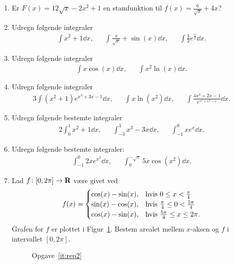 \begin{enumerate}
	\item Er $F(x)=12\sqrt{x}-2x^2+1$ en stamfunktion til $f(x)=\frac{6}{\sqrt{x}}+4x$?
	

	\item Udregn følgende integraler
	\begin{align*}
	\int x^2+1\dd x,&& \int \frac{x}{\sqrt{x}}+\sin(x)\dd x,&& \int \frac{1}{2}e^{\frac{x}{2}}\dd x.
	\end{align*}

		\item Udregn følgende integraler
	\begin{align*}
	\int x\cos(x)\dd x,&& \int x^2 \ln(x)\dd x.
	\end{align*}
	
	\item Udregn følgende integraler
	\begin{align*}
	3\int (x^2+1)e^{x^3+3x-1}\dd x,&& \int x\ln(x^2) \dd x, && \int \frac{4x^3+2x-1}{e^{x^4+x^2-x}} \dd x.
	\end{align*}
	
	\item Udregn følgende bestemte integraler
	\begin{align*}
	2\int_0^1 x^2+1\dd x,&& \int_{-3}^{3} x^3-3x\dd x,&& \int_{-1}^0 xe^x \dd x.
	\end{align*}
	
	\item Udregn følgende bestemte integraler:
	\begin{align*}
	\int_{-1}^0 2xe^{x^2}\dd x,&& \int_{0}^{-\sqrt{\pi}} 5x\cos(x^2)\dd x.
	\end{align*}
	
	\item\label{it:rep2} Lad $f\colon [0,2\pi]\to \mathbf{R}$ være givet ved
	\begin{align*}
	f(x)=\begin{cases}
	\cos(x)-\sin(x),&\textup{hvis } 0\leq x<\frac{\pi}{4}\\
	\sin(x)-\cos(x),& \textup{hvis } \frac{\pi}{4}\leq 0<\frac{5\pi}{4}\\
	\cos(x)- \sin(x),&\textup{hvis } \frac{5\pi}{4}\leq x\leq 2\pi.
	\end{cases}
	\end{align*} 
	Grafen for $f$ er plottet i Figur~\ref{fig:rep2}. Bestem arealet mellem $x$-aksen og $f$ i intervallet $[0,2\pi]$.
		\begin{figure}
		\centering
		\caption{Opgave~\ref{it:rep2}}
		\label{fig:rep2}
	\end{figure}
	

\end{enumerate}
